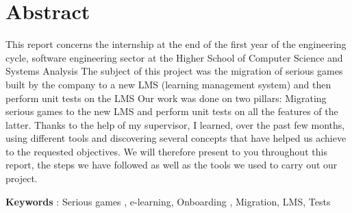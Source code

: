 \chapter*{Abstract}


This report concerns the internship at the end of the first year of the engineering cycle, software engineering sector
at the Higher School of Computer Science and Systems Analysis
The subject of this project was the migration of serious games built by the company to a new
LMS (learning management system) and then perform unit tests on the LMS
Our work was done on two pillars: Migrating serious games to the new LMS and
perform unit tests on all the features of the latter. Thanks to the help of my supervisor, I learned,
over the past few months, using different tools and discovering several concepts that have helped us achieve
to the requested objectives. We will therefore present to you throughout this report, the steps we have followed
as well as the tools we used to carry out our project.

\textbf{Keywords} : Serious games , e-learning,  Onboarding , Migration, LMS, Tests